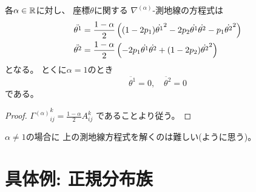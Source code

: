 \documentclass[report]{jlreq}
\begin{document}
\begin{proposition}[$n = 3$での測地線方程式]
    各$\alpha \in \mathbb{R}$に対し、
    座標$\theta$に関する
    $\nabla^{(\alpha)}$-測地線の方程式は
    \begin{alignat}{1}
        \ddot{\theta^1}
            &=
                \frac{1 - \alpha}{2}
                \left({
                    (1 - 2p_1) \dot{\theta^1}^2
                    - 2p_2 \dot{\theta^1} \dot{\theta^2}
                    - p_1 \dot{\theta^2}^2
                }\right)
                \\
        \ddot{\theta^2}
            &=
                \frac{1 - \alpha}{2}
                \left({
                    - 2p_1 \dot{\theta^1} \dot{\theta^2}
                    + (1 - 2p_2) \dot{\theta^2}^2
                }\right)
    \end{alignat}
    となる。
    とくに$\alpha = 1$のとき
    \begin{equation}
        \ddot{\theta^1} = 0,
            \quad
            \ddot{\theta^2} = 0
    \end{equation}
    である。
\end{proposition}

\begin{proof}
    ${\Gamma^{(\alpha)}}_{ij}^k = \frac{1 - \alpha}{2} A_{ij}^k$
    であることより従う。
\end{proof}

$\alpha \neq 1$の場合に
上の測地線方程式を解くのは難しい(ように思う)。



%
\section{具体例: 正規分布族}
\end{document}

